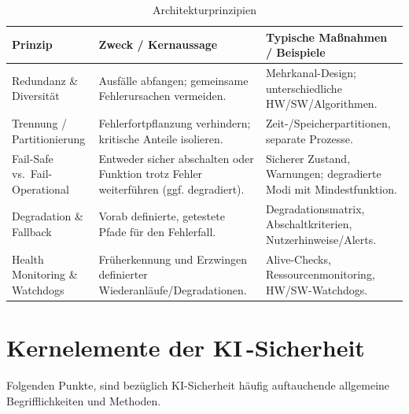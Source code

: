 \begin{table}[h]
\centering
\caption{Architekturprinzipien}
\begin{tabular}{p{}p{}p{}}
\toprule
\textbf{Prinzip} & \textbf{Zweck / Kernaussage} & \textbf{Typische Maßnahmen / Beispiele} \\
\midrule
Redundanz \& Diversität & Ausfälle abfangen; gemeinsame Fehlerursachen vermeiden. &
Mehrkanal-Design; unterschiedliche HW/SW/Algorithmen. \\
\midrule
Trennung / Partitionierung & Fehlerfortpflanzung verhindern; kritische Anteile isolieren. &
Zeit-/Speicherpartitionen, separate Prozesse. \\
\midrule
Fail-Safe vs.\ Fail-Operational & Entweder sicher abschalten oder Funktion trotz Fehler weiterführen (ggf. degradiert). &
Sicherer Zustand, Warnungen; degradierte Modi mit Mindestfunktion. \\
\midrule
Degradation \& Fallback & Vorab definierte, getestete Pfade für den Fehlerfall. &
Degradationsmatrix, Abschaltkriterien, Nutzerhinweise/Alerts. \\
\midrule
Health Monitoring \& Watchdogs & Früherkennung und Erzwingen definierter Wiederanläufe/Degradationen. &
Alive-Checks, Ressourcenmonitoring, HW/SW-Watchdogs. \\
\bottomrule
\end{tabular}
\end{table}


\section{Kernelemente der KI\,-Sicherheit}\label{sec:ai-safety-kern}
Folgenden Punkte, sind bezüglich KI-Sicherheit häufig auftauchende allgemeine Begrifflichkeiten und Methoden. 

